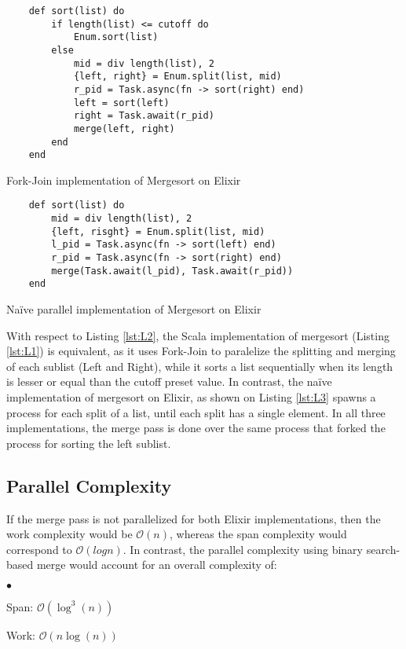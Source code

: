 \documentclass{article}
\newcommand{\squishlist}{
 \begin{list}{$\bullet$}
  { \setlength{\itemsep}{0pt}
     \setlength{\parsep}{3pt}
     \setlength{\topsep}{3pt}
     \setlength{\partopsep}{0pt}
     \setlength{\leftmargin}{1.5em}
     \setlength{\labelwidth}{1em}
     \setlength{\labelsep}{0.5em} } }
\newcommand{\squishend}{
  \end{list}  }
\begin{document}
\begin{listing}
	\begin{verbatim}
	def sort(list) do 
	    if length(list) <= cutoff do
	        Enum.sort(list)
	    else
	        mid = div length(list), 2 
	        {left, right} = Enum.split(list, mid)  
	        r_pid = Task.async(fn -> sort(right) end)
	        left = sort(left)
	        right = Task.await(r_pid)
	        merge(left, right)
	    end 
	end
	\end{verbatim}
	\caption{Fork-Join implementation of Mergesort on Elixir}
	\label{lst:L2}
\end{listing}

\begin{listing}
	\begin{verbatim}
    def sort(list) do 
        mid = div length(list), 2 
        {left, risght} = Enum.split(list, mid) 
        l_pid = Task.async(fn -> sort(left) end) 
        r_pid = Task.async(fn -> sort(right) end) 
        merge(Task.await(l_pid), Task.await(r_pid)) 
    end
	\end{verbatim}
	\caption{Naïve parallel implementation of Mergesort on Elixir}
	\label{lst:L3}
\end{listing}

With respect to Listing \ref{lst:L2}, the Scala implementation of mergesort (Listing \ref{lst:L1}) is equivalent, as it uses Fork-Join to paralelize the splitting and merging of each sublist (Left and Right), while it sorts a list sequentially when its length is lesser or equal than the cutoff preset value. In contrast, the naïve implementation of mergesort on Elixir, as shown on Listing \ref{lst:L3} spawns a process for each split of a list, until each split has a single element. In all three implementations, the merge pass is done over the same process that forked the process for sorting the left sublist.

\subsection{Parallel Complexity}
If the merge pass is not parallelized for both Elixir implementations, then the work complexity would be $\mathcal{O}(n)$, whereas the span complexity would correspond to $\mathcal{O}(log n)$. In contrast, the parallel complexity using binary search-based merge would account for an overall complexity of:

\squishlist
\item Span: $\mathcal{O}(\log^3(n))$
\item Work: $\mathcal{O}(n \log(n))$
\squishend   
\end{document}
